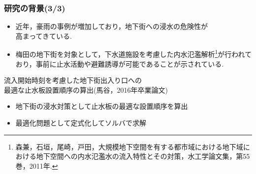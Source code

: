 \documentclass[12pt,dvipdfmx]{beamer}
\begin{document}
     {
       \frametitle{研究の背景(3/3)}

       \begin{itemize}
       \item 近年，豪雨の事例が増加しており，地下街への浸水の危険性が\\高まってきている.
       \item 梅田の地下街を対象として，下水道施設を考慮した内水氾濫解析\footnote{森兼，石垣，尾崎，戸田，大規模地下空間を有する都市域における地下域における地下空間への内水氾濫水の流入特性とその対策，水工学論文集，第55巻，2011年.}が行われており，事前に止水活動や避難誘導が可能であることが示されている.
       \end{itemize}

       \begin{beamerboxesrounded}
             {流入開始時刻を考慮した地下街出入り口への\\最適な止水板設置順序の算出(馬谷，2016年卒業論文)}
             \begin{itemize}
             \item 地下街の浸水対策として止水板の最適な設置順序を算出
             \item 最適化問題として定式化してソルバで求解
             \end{itemize}
       \end{beamerboxesrounded}
       
             
     }
\frame
\end{document}
